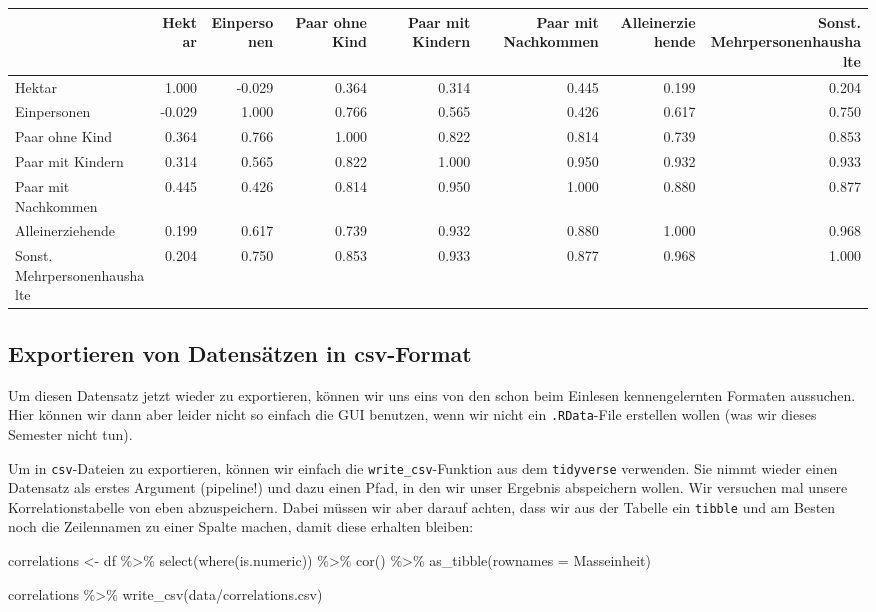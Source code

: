 \documentclass[
]{book}
\newenvironment{Shaded}{\begin{snugshade}}{\end{snugshade}}
\newcommand{\AttributeTok}[1]{\textcolor[rgb]{0.77,0.63,0.00}{#1}}
\newcommand{\FunctionTok}[1]{\textcolor[rgb]{0.00,0.00,0.00}{#1}}
\newcommand{\NormalTok}[1]{#1}
\newcommand{\OtherTok}[1]{\textcolor[rgb]{0.56,0.35,0.01}{#1}}
\newcommand{\SpecialCharTok}[1]{\textcolor[rgb]{0.00,0.00,0.00}{#1}}
\newcommand{\StringTok}[1]{\textcolor[rgb]{0.31,0.60,0.02}{#1}}
\begin{document}
\begin{tabular}[t]{l|r|r|r|r|r|r|r}
\hline
  & Hektar & Einpersonen & Paar ohne Kind & Paar mit Kindern & Paar mit Nachkommen & Alleinerziehende & Sonst. Mehrpersonenhaushalte\\
\hline
Hektar & 1.000 & -0.029 & 0.364 & 0.314 & 0.445 & 0.199 & 0.204\\
\hline
Einpersonen & -0.029 & 1.000 & 0.766 & 0.565 & 0.426 & 0.617 & 0.750\\
\hline
Paar ohne Kind & 0.364 & 0.766 & 1.000 & 0.822 & 0.814 & 0.739 & 0.853\\
\hline
Paar mit Kindern & 0.314 & 0.565 & 0.822 & 1.000 & 0.950 & 0.932 & 0.933\\
\hline
Paar mit Nachkommen & 0.445 & 0.426 & 0.814 & 0.950 & 1.000 & 0.880 & 0.877\\
\hline
Alleinerziehende & 0.199 & 0.617 & 0.739 & 0.932 & 0.880 & 1.000 & 0.968\\
\hline
Sonst. Mehrpersonenhaushalte & 0.204 & 0.750 & 0.853 & 0.933 & 0.877 & 0.968 & 1.000\\
\hline
\end{tabular}

\hypertarget{exportieren-von-datensuxe4tzen-in-csv-format}{%
\subsection{Exportieren von Datensätzen in csv-Format}\label{exportieren-von-datensuxe4tzen-in-csv-format}}

Um diesen Datensatz jetzt wieder zu exportieren, können wir uns eins von den schon beim Einlesen kennengelernten Formaten aussuchen. Hier können wir dann aber leider nicht so einfach die GUI benutzen, wenn wir nicht ein \texttt{.RData}-File erstellen wollen (was wir dieses Semester nicht tun).

Um in \texttt{csv}-Dateien zu exportieren, können wir einfach die \texttt{write\_csv}-Funktion aus dem \texttt{tidyverse} verwenden. Sie nimmt wieder einen Datensatz als erstes Argument (pipeline!) und dazu einen Pfad, in den wir unser Ergebnis abspeichern wollen. Wir versuchen mal unsere Korrelationstabelle von eben abzuspeichern. Dabei müssen wir aber darauf achten, dass wir aus der Tabelle ein \texttt{tibble} und am Besten noch die Zeilennamen zu einer Spalte machen, damit diese erhalten bleiben:

\begin{Shaded}
\begin{Highlighting}[]
\NormalTok{correlations }\OtherTok{\textless{}{-}} 
\NormalTok{  df }\SpecialCharTok{\%\textgreater{}\%} 
  \FunctionTok{select}\NormalTok{(}\FunctionTok{where}\NormalTok{(is.numeric)) }\SpecialCharTok{\%\textgreater{}\%} 
  \FunctionTok{cor}\NormalTok{() }\SpecialCharTok{\%\textgreater{}\%} 
  \FunctionTok{as\_tibble}\NormalTok{(}\AttributeTok{rownames =} \StringTok{\textquotesingle{}Masseinheit\textquotesingle{}}\NormalTok{)}

\NormalTok{correlations }\SpecialCharTok{\%\textgreater{}\%} 
  \FunctionTok{write\_csv}\NormalTok{(}\StringTok{\textquotesingle{}data/correlations.csv\textquotesingle{}}\NormalTok{)}
\end{Highlighting}
\end{Shaded}
\end{document}

